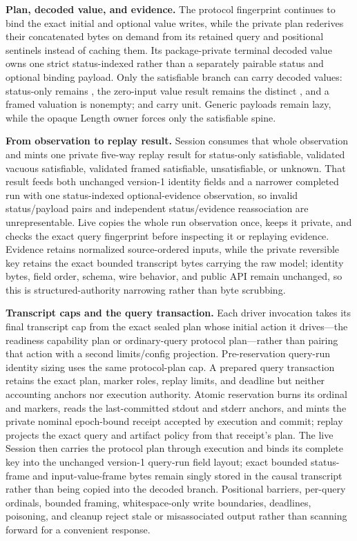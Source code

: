\documentclass[10pt,letterpaper,oneside]{report}
\newcommand{\code}[1]{\texttt{\detokenize{#1}}}
\begin{document}
\begin{enumerate}
  \textbf{Plan, decoded value, and evidence.} The protocol fingerprint continues to bind the exact initial and optional value writes, while the private plan rederives their concatenated bytes on demand from its retained query and positional sentinels instead of caching them. Its package-private terminal decoded value owns one strict status-indexed \code{SolverObservation} rather than a separately pairable status and optional binding payload. Only the satisfiable branch can carry decoded values: status-only \code{sat} remains \code{Nothing}, the zero-input value result remains the distinct \code{Just []}, and a framed valuation is nonempty; \code{unsat} and \code{unknown} carry unit. Generic payloads remain lazy, while the opaque Length owner forces only the satisfiable \code{Maybe} spine.

  \textbf{From observation to replay result.} Session consumes that whole observation and mints one private five-way replay result for status-only satisfiable, validated vacuous satisfiable, validated framed satisfiable, unsatisfiable, or unknown. That result feeds both unchanged version-1 identity fields and a narrower completed run with one status-indexed optional-evidence observation, so invalid status/payload pairs and independent status/evidence reassociation are unrepresentable. Live copies the whole run observation once, keeps it private, and checks the exact query fingerprint before inspecting it or replaying evidence. Evidence retains normalized source-ordered inputs, while the private reversible key retains the exact bounded transcript bytes carrying the raw model; identity bytes, field order, schema, wire behavior, and public API remain unchanged, so this is structured-authority narrowing rather than byte scrubbing.

  \textbf{Transcript caps and the query transaction.} Each driver invocation takes its final transcript cap from the exact sealed plan whose initial action it drives---the readiness capability plan or ordinary-query protocol plan---rather than pairing that action with a second limits/config projection. Pre-reservation query-run identity sizing uses the same protocol-plan cap. A prepared query transaction retains the exact plan, marker roles, replay limits, and deadline but neither accounting anchors nor execution authority. Atomic reservation burns its ordinal and markers, reads the last-committed stdout and stderr anchors, and mints the private nominal epoch-bound receipt accepted by execution and commit; replay projects the exact query and artifact policy from that receipt's plan. The live Session then carries the protocol plan through execution and binds its complete key into the unchanged version-1 query-run field layout; exact bounded status-frame and input-value-frame bytes remain singly stored in the causal transcript rather than being copied into the decoded branch. Positional barriers, per-query ordinals, bounded framing, whitespace-only write boundaries, deadlines, poisoning, and cleanup reject stale or misassociated output rather than scanning forward for a convenient response.


\end{enumerate}
\end{document}

